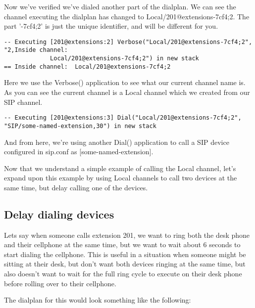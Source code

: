 Now we've verified we've dialed another part of the dialplan. We can see the
channel executing the dialplan has changed to Local/201@extensions-7cf4;2. The
part '-7cf4;2' is just the unique identifier, and will be different for you.

\begin{astlisting}
\begin{verbatim}
-- Executing [201@extensions:2] Verbose("Local/201@extensions-7cf4;2", "2,Inside channel:  
             Local/201@extensions-7cf4;2") in new stack
== Inside channel:  Local/201@extensions-7cf4;2
\end{verbatim}
\end{astlisting}

Here we use the Verbose() application to see what our current channel name is.
As you can see the current channel is a Local channel which we created from our
SIP channel.

\begin{astlisting}
\begin{verbatim}
-- Executing [201@extensions:3] Dial("Local/201@extensions-7cf4;2", "SIP/some-named-extension,30") in new stack
\end{verbatim}
\end{astlisting}

And from here, we're using another Dial() application to call a SIP device
configured in sip.conf as [some-named-extension].

Now that we understand a simple example of calling the Local channel, let's
expand upon this example by using Local channels to call two devices at the same
time, but delay calling one of the devices.

\subsection{Delay dialing devices}

Lets say when someone calls extension 201, we want to ring both the desk phone
and their cellphone at the same time, but we want to wait about 6 seconds to
start dialing the cellphone. This is useful in a situation when someone might be
sitting at their desk, but don't want both devices ringing at the same time, but
also doesn't want to wait for the full ring cycle to execute on their desk phone
before rolling over to their cellphone.

The dialplan for this would look something like the following:

